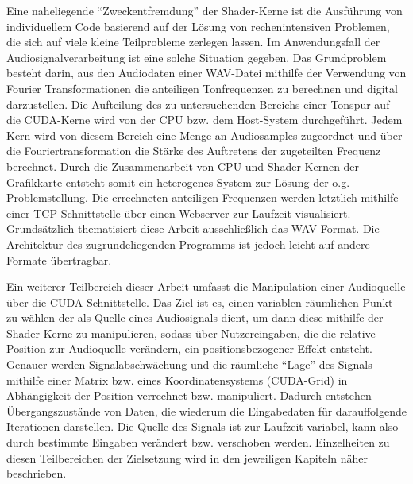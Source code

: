 Eine naheliegende \enquote{Zweckentfremdung} der Shader-Kerne ist die Ausführung von individuellem Code basierend auf der Lösung von rechenintensiven Problemen, die sich auf viele kleine Teilprobleme zerlegen lassen. Im Anwendungsfall der Audiosignalverarbeitung ist eine solche Situation gegeben. Das Grundproblem besteht darin, aus den Audiodaten einer WAV-Datei mithilfe der Verwendung von Fourier Transformationen die anteiligen Tonfrequenzen zu berechnen und digital darzustellen. Die Aufteilung des zu untersuchenden Bereichs einer Tonspur auf die CUDA-Kerne wird von der CPU bzw. dem Host-System durchgeführt. Jedem Kern wird von diesem Bereich eine Menge an Audiosamples zugeordnet und über die Fouriertransformation die Stärke des Auftretens der zugeteilten Frequenz berechnet. Durch die Zusammenarbeit von CPU und Shader-Kernen der Grafikkarte entsteht somit ein heterogenes System zur Lösung der o.g. Problemstellung. 
Die errechneten anteiligen Frequenzen werden letztlich mithilfe einer TCP-Schnittstelle über einen Webserver zur Laufzeit visualisiert. Grundsätzlich thematisiert diese Arbeit ausschließlich das WAV-Format. Die Architektur des zugrundeliegenden Programms ist jedoch leicht auf andere Formate übertragbar.


Ein weiterer Teilbereich dieser Arbeit umfasst die Manipulation einer Audioquelle über die CUDA-Schnittstelle.
Das Ziel ist es, einen variablen räumlichen Punkt zu wählen der als Quelle eines Audiosignals dient, um dann diese mithilfe der Shader-Kerne zu manipulieren, sodass über Nutzereingaben, die die relative Position zur Audioquelle verändern, ein positionsbezogener Effekt entsteht. Genauer werden Signalabschwächung und die räumliche \enquote{Lage} des Signals mithilfe einer Matrix bzw. eines Koordinatensystems (CUDA-Grid) in Abhängigkeit der Position verrechnet bzw. manipuliert. Dadurch entstehen Übergangszustände von Daten, die wiederum die Eingabedaten für darauffolgende Iterationen darstellen.
Die Quelle des Signals ist zur Laufzeit variabel, kann also durch bestimmte Eingaben verändert bzw. verschoben werden.
Einzelheiten zu diesen Teilbereichen der Zielsetzung wird in den jeweiligen Kapiteln näher beschrieben.